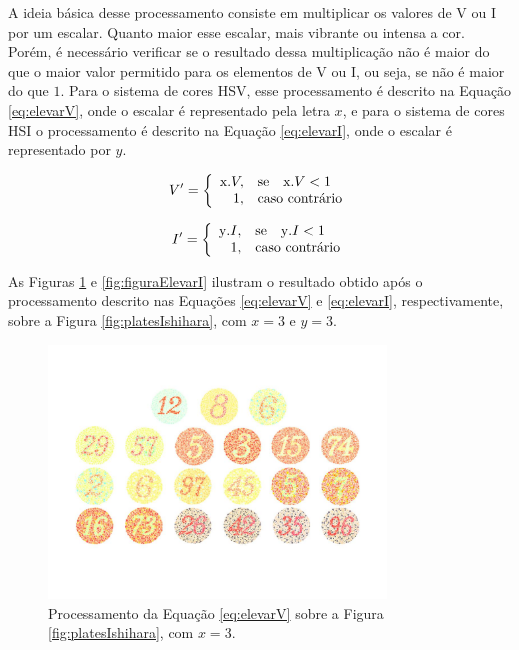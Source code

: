 \documentclass[	12pt, Times, openright, twoside, a4paper, english, brazil]{abntex2}
\begin{document}
A ideia básica desse processamento consiste em multiplicar os valores de V ou I por um escalar. Quanto maior esse escalar, mais vibrante ou intensa a cor. Porém, é necessário verificar se o resultado dessa multiplicação não é maior do que o maior valor permitido para os elementos de V ou I, ou seja, se não é maior do que $1$. Para o sistema de cores HSV, esse processamento é descrito na Equação \ref{eq:elevarV}, onde o escalar é representado pela letra $x$, e para o sistema de cores HSI o processamento é descrito na Equação \ref{eq:elevarI}, onde o escalar é representado por $y$.

\begin{equation}
\label{eq:elevarV}
V'=\left\{
\begin{array}{rl}
       $x$ . V,&\mbox{se}\quad $x$ . V < 1 \\
       1,&\mbox{caso contrário}
\end{array}\right.
\end{equation}

\begin{equation}
\label{eq:elevarI}
I'=\left\{
\begin{array}{rl}
       $y$ . I,&\mbox{se}\quad $y$ . I < 1 \\
       1,&\mbox{caso contrário}
\end{array}\right.
\end{equation}

As Figuras \ref{fig:figuraElevarV} e \ref{fig:figuraElevarI} ilustram o resultado obtido após o processamento descrito nas Equações \ref{eq:elevarV} e \ref{eq:elevarI}, respectivamente, sobre a Figura \ref{fig:platesIshihara}, com $x = 3$ e $y = 3$.

\begin{figure}[!htb]
\centering \includegraphics[width=0.80\textwidth]{figuraElevarV.jpg}
\caption{Processamento da Equação \ref{eq:elevarV} sobre a Figura \ref{fig:platesIshihara}, com $x = 3$. \label{fig:figuraElevarV}}
\end{figure}
\end{document}
